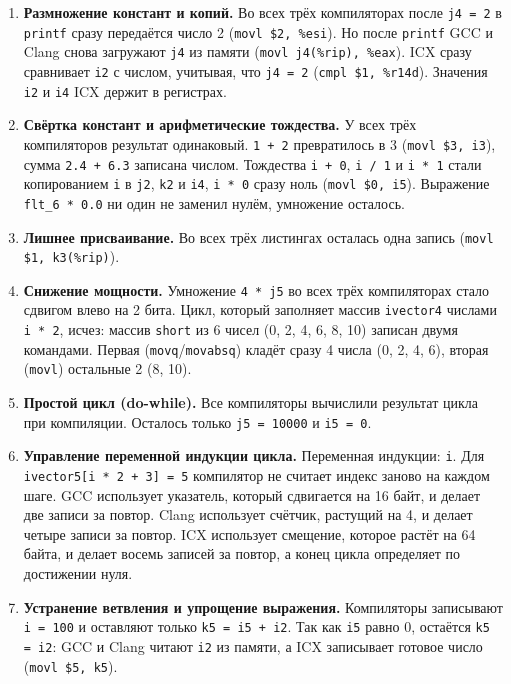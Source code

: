 \documentclass[a4paper]{article}
\begin{document}
\begin{enumerate}
    \item \textbf{Размножение констант и копий.} Во всех трёх компиляторах после \texttt{j4 = 2} в \texttt{printf} сразу передаётся число 2 (\texttt{movl \$2, \%esi}). Но после \texttt{printf} GCC и Clang снова загружают \texttt{j4} из памяти (\texttt{movl j4(\%rip), \%eax}). ICX сразу сравнивает \texttt{i2} с числом, учитывая, что \texttt{j4 = 2} (\texttt{cmpl \$1, \%r14d}). Значения \texttt{i2} и \texttt{i4} ICX держит в регистрах.
    \item \textbf{Свёртка констант и арифметические тождества.} У всех трёх компиляторов результат одинаковый. \texttt{1 + 2} превратилось в 3 (\texttt{movl \$3, i3}), сумма \texttt{2.4 + 6.3} записана числом. Тождества \texttt{i + 0}, \texttt{i / 1} и \texttt{i * 1} стали копированием \texttt{i} в \texttt{j2}, \texttt{k2} и \texttt{i4}, \texttt{i * 0} сразу ноль (\texttt{movl \$0, i5}). Выражение \texttt{flt\_6 * 0.0} ни один не заменил нулём, умножение осталось.
    \item \textbf{Лишнее присваивание.} Во всех трёх листингах осталась одна запись (\texttt{movl \$1, k3(\%rip)}).
    \item \textbf{Снижение мощности.} Умножение \texttt{4 * j5} во всех трёх компиляторах стало сдвигом влево на 2 бита. Цикл, который заполняет массив \texttt{ivector4} числами \texttt{i * 2}, исчез: массив \texttt{short} из 6 чисел (0, 2, 4, 6, 8, 10) записан двумя командами. Первая (\texttt{movq}/\texttt{movabsq}) кладёт сразу 4 числа (0, 2, 4, 6), вторая (\texttt{movl}) остальные 2 (8, 10).
    \item \textbf{Простой цикл (do-while).} Все компиляторы вычислили результат цикла при компиляции. Осталось только \texttt{j5 = 10000} и \texttt{i5 = 0}.
    \item \textbf{Управление переменной индукции цикла.} Переменная индукции: \texttt{i}. Для \texttt{ivector5[i * 2 + 3] = 5} компилятор не считает индекс заново на каждом шаге. GCC использует указатель, который сдвигается на 16 байт, и делает две записи за повтор. Clang использует счётчик, растущий на 4, и делает четыре записи за повтор. ICX использует смещение, которое растёт на 64 байта, и делает восемь записей за повтор, а конец цикла определяет по достижении нуля.
    \item \textbf{Устранение ветвления и упрощение выражения.} Компиляторы записывают \texttt{i = 100} и оставляют только \texttt{k5 = i5 + i2}. Так как \texttt{i5} равно 0, остаётся \texttt{k5 = i2}: GCC и Clang читают \texttt{i2} из памяти, а ICX записывает готовое число (\texttt{movl \$5, k5}).

\end{enumerate}
\end{document}
